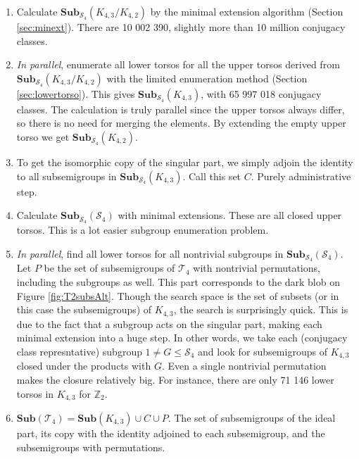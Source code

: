 \documentclass{amsart}
\newcommand{\cT}{{\mathcal T}}
\newcommand{\cS}{{\mathcal S}}
\newcommand{\Sub}{\mathbf{Sub}}
\theoremstyle{plain}
\theoremstyle{definition}
\begin{document}
\begin{enumerate}
\item Calculate $\Sub_{\cS_4}(K_{4,3}/K_{4,2})$ by the minimal extension algorithm (Section \ref{sec:minext}). There are 10 002 390, slightly more than 10 million conjugacy classes.  
\item \emph{In parallel}, enumerate all lower torsos for all the upper torsos derived from  $\Sub_{\cS_4}(K_{4,3}/K_{4,2})$ with the limited enumeration method (Section \ref{sec:lowertorso}). This gives $\Sub_{\cS_4}(K_{4,3})$, with  65 997 018 conjugacy classes. The calculation is truly parallel since the upper torsos always differ, so there is no need for merging the elements. By extending the empty upper torso we get $\Sub_{\cS_4}(K_{4,2})$.
\item To get the isomorphic copy of the singular part, we simply adjoin the identity to all subsemigroups in $\Sub_{\cS_4}(K_{4,3})$. Call this set $C$.
Purely administrative step.
\item Calculate $\Sub_{\cS_4}(\cS_4)$ with minimal extensions. These are all closed upper torsos. This is a lot easier subgroup enumeration problem.
\item \emph{In parallel}, find all lower torsos for all nontrivial subgroups in $\Sub_{\cS_4}(\cS_4)$. Let $P$ be the set of subsemigroups of $\cT_4$ with nontrivial permutations, including the subgroups as well. This part corresponds to the dark blob on Figure \ref{fig:T2subsAlt}.
Though the search space is the set of subsets (or in this case the subsemigroups) of $K_{4,3}$, the search is surprisingly quick.
This is due to the fact that a subgroup acts on the singular part, making each minimal extension into a huge step.
In other words, we take each (conjugacy class represntative) subgroup $1\neq G\leq \cS_4$ and look for subsemigroups of $K_{4,3}$ closed under the products with $G$.
Even a single nontrivial permutation makes the closure relatively big.
For instance, there are only 71 146 lower torsos in $K_{4,3}$ for $\mathbb{Z}_2$.
\item $\Sub(\cT_4)=\Sub(K_{4,3})\cup C \cup P$. The set of subsemigroups of the ideal part, its copy with the identity adjoined to each subsemigroup, and the subsemigroups with permutations.
\end{enumerate}
\end{document}
